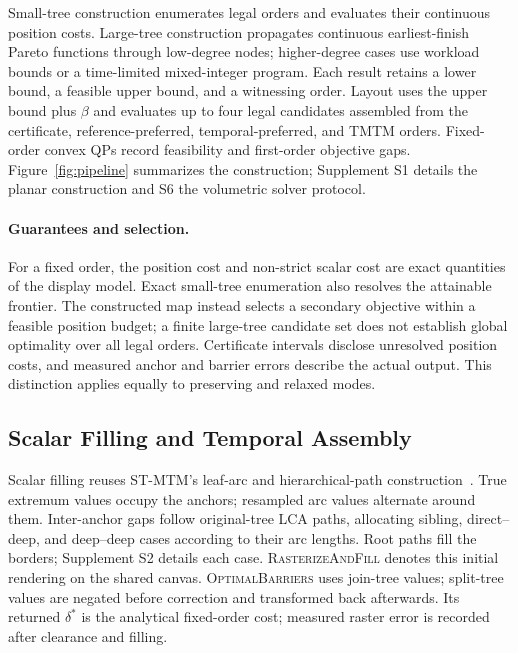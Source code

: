Small-tree construction enumerates legal orders and evaluates their continuous position costs. Large-tree construction propagates continuous earliest-finish Pareto functions through low-degree nodes; higher-degree cases use workload bounds or a time-limited mixed-integer program. Each result retains a lower bound, a feasible upper bound, and a witnessing order. Layout uses the upper bound plus $\beta$ and evaluates up to four legal candidates assembled from the certificate, reference-preferred, temporal-preferred, and TMTM orders. Fixed-order convex QPs record feasibility and first-order objective gaps. Figure~\ref{fig:pipeline} summarizes the construction; Supplement S1 details the planar construction and S6 the volumetric solver protocol.

\paragraph{Guarantees and selection.}
For a fixed order, the position cost and non-strict scalar cost are exact quantities of the display model. Exact small-tree enumeration also resolves the attainable frontier. The constructed map instead selects a secondary objective within a feasible position budget; a finite large-tree candidate set does not establish global optimality over all legal orders. Certificate intervals disclose unresolved position costs, and measured anchor and barrier errors describe the actual output. This distinction applies equally to preserving and relaxed modes.

\subsection{Scalar Filling and Temporal Assembly}\label{sec:domain_filling}

Scalar filling reuses ST-MTM's leaf-arc and hierarchical-path construction~\cite{STMTM:2026}. True extremum values occupy the anchors; resampled arc values alternate around them. Inter-anchor gaps follow original-tree LCA paths, allocating sibling, direct--deep, and deep--deep cases according to their arc lengths. Root paths fill the borders; Supplement S2 details each case.
\textsc{RasterizeAndFill} denotes this initial rendering on the shared canvas. \textsc{OptimalBarriers} uses join-tree values; split-tree values are negated before correction and transformed back afterwards. Its returned $\delta^*$ is the analytical fixed-order cost; measured raster error is recorded after clearance and filling.

